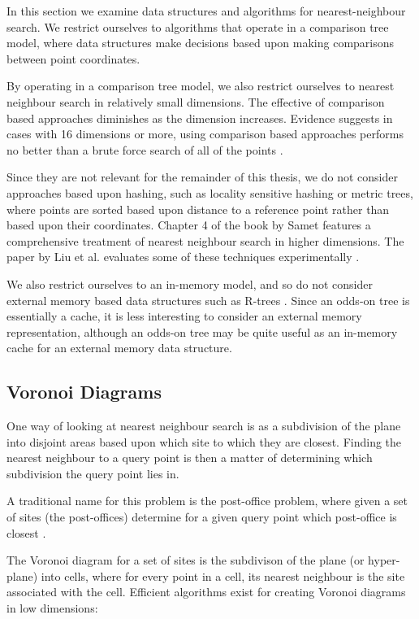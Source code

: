 \documentclass[mcs]{scsthesis}
\begin{document}
In this section we examine data structures and algorithms for nearest-neighbour
search. We restrict ourselves to algorithms that operate in a comparison tree
model, where data structures make decisions based upon making comparisons
between point coordinates.

By operating in a comparison tree model, we also restrict ourselves to nearest
neighbour search in relatively small dimensions. The effective of comparison
based approaches diminishes as the dimension increases. Evidence suggests in
cases with 16 dimensions or more, using comparison based approaches performs no
better than a brute force search of all of the points \cite{fastvector}.

Since they are not relevant for the remainder of this thesis, we do not consider
approaches based upon hashing, such as locality sensitive hashing \cite{lsh}
or metric trees, where points are sorted based upon distance to a reference
point rather than based upon their coordinates. Chapter 4 of the book by Samet
\cite{samet} features a comprehensive treatment of nearest neighbour search in
higher dimensions. The paper by Liu et al. evaluates some of these techniques
experimentally \cite{practicalann}. 

We also restrict ourselves to an in-memory model, and so do not consider
external memory based data structures such as R-trees \cite{rtree}. Since an
odds-on tree is essentially a cache, it is less interesting to consider an
external memory representation, although an odds-on tree may be quite useful
as an in-memory cache for an external memory data structure.

\subsection{Voronoi Diagrams}

One way of looking at nearest neighbour search is as a subdivision of the plane
into disjoint areas based upon which site to which they are closest. Finding
the nearest neighbour to a query point is then a matter of determining which
subdivision the query point lies in.

A traditional name for this problem is the post-office problem, where given a
set of sites (the post-offices) determine for a given query point which
post-office is closest \cite{dutch}.

The Voronoi diagram for a set of sites is the subdivison of the plane (or
hyper-plane) into cells, where for every point in a cell, its nearest neighbour
is the site associated with the cell. Efficient algorithms exist for creating
Voronoi diagrams in low dimensions:
\end{document}
